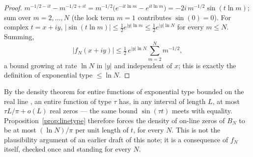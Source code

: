 \documentclass[10pt,a4paper]{article}
\theoremstyle{plain}
\theoremstyle{definition}
\theoremstyle{remark}
\begin{document}
\begin{proof}
\(m^{-1/2-it}-m^{-1/2+it}=m^{-1/2}\bigl(e^{-it\ln m}-e^{it\ln m}\bigr)=-2i\,m^{-1/2}\sin(t\ln m)\); sum over \(m=2,\ldots,N\) (the lock term \(m=1\) contributes \(\sin(0)=0\)).
For complex \(t=x+iy\), \(|\sin(t\ln m)|\le\tfrac12 e^{|y|\ln m}\le\tfrac12 e^{|y|\ln N}\) for every \(m\le N\).
Summing,
\[
|f_N(x+iy)|\le\tfrac12\,e^{|y|\ln N}\sum_{m=2}^N m^{-1/2},
\]
a bound growing at rate \(\ln N\) in \(|y|\) and independent of \(x\); this is exactly the definition of exponential type \(\le\ln N\).
\end{proof}

By the density theorem for entire functions of exponential type bounded on the real line \cite{boas1954}, an entire function of type \(\tau\) has, in any interval of length \(L\), at most \(\tau L/\pi+o(L)\) real zeros --- the same bound \(\sin(\tau t)\) meets with equality.
Proposition~\ref{prop:linetype} therefore forces the density of on-line zeros of \(B_N\) to be at most \((\ln N)/\pi\) per unit length of \(t\), for every \(N\).
This is not the plausibility argument of an earlier draft of this note; it is a consequence of \(f_N\) itself, checked once and standing for every \(N\).
\end{document}
